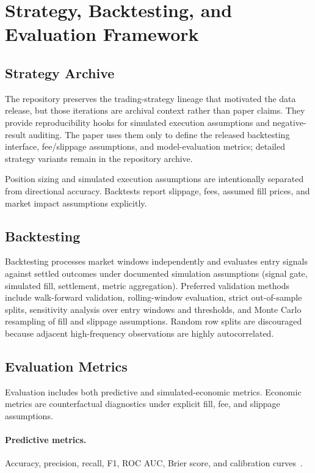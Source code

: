 \section{Strategy, Backtesting, and Evaluation Framework}
\label{sec:strategy}

\subsection{Strategy Archive}

The repository preserves the trading-strategy lineage that motivated the data
release, but those iterations are archival context rather than paper claims.
They provide reproducibility hooks for simulated execution assumptions and
negative-result auditing. The paper uses them only to define the released
backtesting interface, fee/slippage assumptions, and model-evaluation metrics;
detailed strategy variants remain in the repository archive.

Position sizing and simulated execution assumptions are intentionally separated
from directional accuracy. Backtests report slippage, fees, assumed fill
prices, and market impact assumptions explicitly.

\subsection{Backtesting}
\label{sec:backtesting}

Backtesting processes market windows independently and evaluates entry signals
against settled outcomes under documented simulation assumptions (signal gate,
simulated fill, settlement, metric aggregation). Preferred
validation methods include walk-forward validation, rolling-window evaluation,
strict out-of-sample splits, sensitivity analysis over entry windows and
thresholds, and Monte Carlo resampling of fill and slippage assumptions. Random
row splits are discouraged because adjacent high-frequency observations are
highly autocorrelated.

\subsection{Evaluation Metrics}
\label{sec:evaluation}

Evaluation includes both predictive and simulated-economic metrics.
Economic metrics are counterfactual diagnostics under explicit fill, fee, and
slippage assumptions.

\paragraph{Predictive metrics.}
Accuracy, precision, recall, F1, ROC AUC, Brier score, and calibration
curves~\cite{brier1950verification}.

